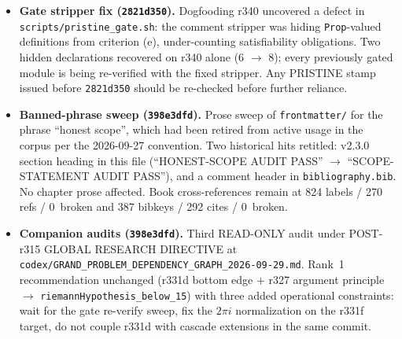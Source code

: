 \begin{itemize}
\item \textbf{Gate stripper fix (\texttt{2821d350}).} Dogfooding r340
uncovered a defect in \texttt{scripts/pristine\_gate.sh}: the comment
stripper was hiding \texttt{Prop}-valued definitions from criterion (e),
under-counting satisfiability obligations. Two hidden declarations
recovered on r340 alone (6 $\to$ 8); every previously gated module is
being re-verified with the fixed stripper. Any PRISTINE stamp issued
before \texttt{2821d350} should be re-checked before further reliance.

\item \textbf{Banned-phrase sweep (\texttt{398e3dfd}).} Prose sweep of
\texttt{frontmatter/} for the phrase ``honest scope'', which had been
retired from active usage in the corpus per the 2026-09-27 convention.
Two historical hits retitled: v2.3.0 section heading in this file
(``HONEST-SCOPE AUDIT PASS'' $\to$ ``SCOPE-STATEMENT AUDIT PASS''), and
a comment header in \texttt{bibliography.bib}. No chapter prose
affected. Book cross-references remain at 824 labels / 270 refs /
0~broken and 387 bibkeys / 292 cites / 0~broken.

\item \textbf{Companion audits (\texttt{398e3dfd}).} Third READ-ONLY
audit under POST-r315 GLOBAL RESEARCH DIRECTIVE at
\texttt{codex/GRAND\_PROBLEM\_DEPENDENCY\_GRAPH\_2026-09-29.md}. Rank~1
recommendation unchanged (r331d bottom edge $+$ r327 argument principle
$\to$ \texttt{riemannHypothesis\_below\_15}) with three added
operational constraints: wait for the gate re-verify sweep, fix the
$2\pi i$ normalization on the r331f target, do not couple r331d with
cascade extensions in the same commit.

\end{itemize}

